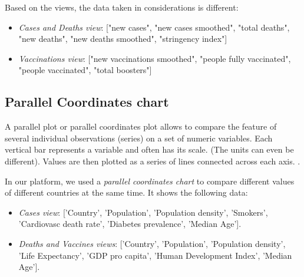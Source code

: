\documentclass[10pt,conference]{IEEEtran}
\begin{document}
Based on the views, the data taken in considerations is different:
\begin{itemize}
 \item {\em Cases and Deaths view}: ["new cases", "new cases smoothed", "total deaths", "new deaths", "new deaths smoothed", "stringency index"]
 \item {\em Vaccinations view}: ["new vaccinations smoothed", "people fully vaccinated", "people vaccinated", "total boosters"]
\end{itemize}

\begin{figure}
\end{figure}

\subsection{Parallel Coordinates chart}
A parallel plot or parallel coordinates plot allows to compare the feature of several individual observations (series) on a set of numeric variables. Each vertical bar represents a variable and often has its scale. (The units can even be different). Values are then plotted as a series of lines connected across each axis. \cite{paral}.

In our platform, we used a {\em parallel coordinates chart} to compare different values of different countries at the same time. 
It shows the following data:
\begin{itemize}
 \item {\em Cases view}: ['Country', 'Population', 'Population density', 'Smokers', 'Cardiovasc death rate', 'Diabetes prevalence', 'Median Age']. 
 \item {\em Deaths and Vaccines views}: ['Country', 'Population', 'Population density', 'Life Expectancy', 'GDP pro capita', 'Human Development Index', 'Median Age']. 
\end{itemize}
\end{document}
